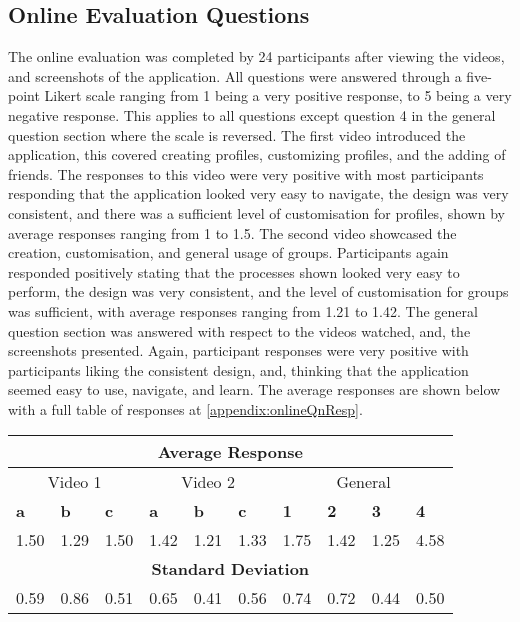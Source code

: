\subsection{Online Evaluation Questions}

The online evaluation was completed by 24 participants after viewing the videos, and screenshots of the application. All questions were answered through a five-point Likert scale ranging from 1 being a very positive response, to 5 being a very negative response. This applies to all questions except question 4 in the general question section where the scale is reversed. The first video introduced the application, this covered creating profiles, customizing profiles, and the adding of friends. The responses to this video were very positive with most participants responding that the application looked very easy to navigate, the design was very consistent, and there was a sufficient level of customisation for profiles, shown by average responses ranging from 1 to 1.5. The second video showcased the creation, customisation, and general usage of groups. Participants again responded positively stating that the processes shown looked very easy to perform, the design was very consistent, and the level of customisation for groups was sufficient, with average responses ranging from 1.21 to 1.42. The general question section was answered with respect to the videos watched, and, the screenshots presented. Again, participant responses were very positive with participants liking the consistent design, and, thinking that the application seemed easy to use, navigate, and learn. The average responses are shown below with a full table of responses at \ref{appendix:onlineQnResp}.

\begin{table}[!ht]
    \centering
    \begin{tabular}{|l|l|l||l|l|l||l|l|l|l|}
    \hline
    \multicolumn{10}{|c|}{\textbf{Average Response }} \\
    \hline
     \multicolumn{3}{|c||}{Video 1 } &
     \multicolumn{3}{|c||}{Video 2 } &
     \multicolumn{4}{|c|}{General } \\
    \hline
        \textbf{a} & \textbf{b} & \textbf{c} & \textbf{a} & \textbf{b} & \textbf{c} & \textbf{1} & \textbf{2} & \textbf{3} & \textbf{4} \\ \hline
    \hline
        1.50 & 1.29 & 1.50 & 1.42 & 1.21 & 1.33 & 1.75 & 1.42 & 1.25 & 4.58 \\ \hline
        \multicolumn{10}{|c|}{\textbf{Standard Deviation }} \\ \hline
        0.59 & 0.86 & 0.51 & 0.65 & 0.41 & 0.56 & 0.74 & 0.72 & 0.44 & 0.50 \\ \hline
    \end{tabular}
\end{table}

